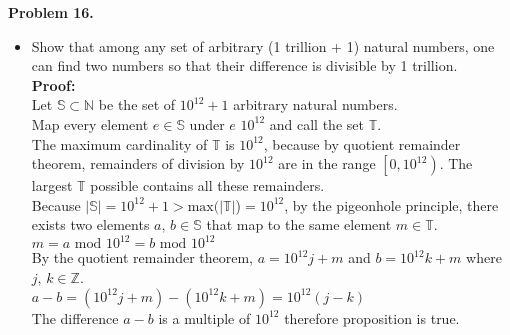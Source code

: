 \documentclass[letterpaper,fleqn]{article}
\begin{document}
		\textbf{Problem 16.}
		\begin{itemize}
			\item [] Show that among any set of arbitrary (1 trillion + 1) natural numbers, one can find two numbers so that their difference is divisible by 1 trillion. \\
			\textbf{Proof:} \\
			Let $\mathbb{S} \subset \mathbb{N}$ be the set of $10^{12}+1$ arbitrary natural numbers. \\
			Map every element $e \in \mathbb{S}$ under $e$  $10^{12}$ and call the set $\mathbb{T}$. \\
			The maximum cardinality of $\mathbb{T}$ is $10^{12}$, because by quotient remainder theorem, remainders of division by $10^{12}$ are in the range $\left[0,10^{12}\right)$. The largest $\mathbb{T}$ possible contains all these remainders. \\
			Because $|\mathbb{S}|=10^{12}+1 > \text{max}(|\mathbb{T}|$)$=10^{12}$, by the pigeonhole principle, there exists two elements $a,\, b \in \mathbb{S}$ that map to the same element $m \in \mathbb{T}$. \\
			$m=a\text{ mod }10^{12} = b\text{ mod }10^{12}$ \\
			By the quotient remainder theorem, $a=10^{12}j+m$ and $b=10^{12}k+m$ where $j,\, k \in \mathbb{Z}$. \\
			$a-b = (10^{12}j+m)-(10^{12}k+m)=10^{12}(j-k)$ \\
			The difference $a-b$ is a multiple of $10^{12}$ therefore proposition is true. \\
		\end{itemize}
		
\end{document}
